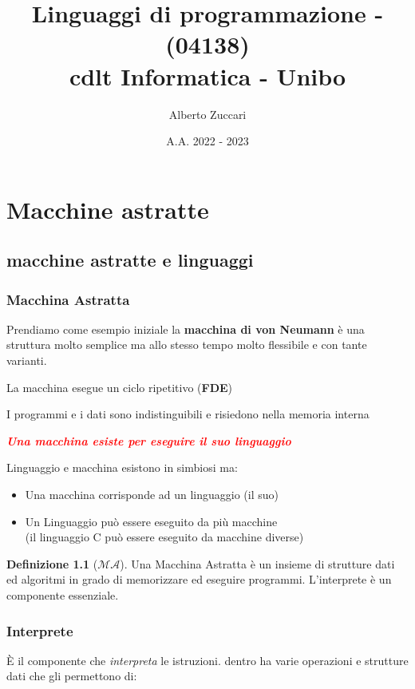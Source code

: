 \documentclass[a4paper,11pt,hidelinks]{book}
\title{Linguaggi di programmazione - (04138)
    \\ cdlt Informatica - Unibo}
\author{Alberto Zuccari}
\date{A.A. 2022 - 2023}
\theoremstyle{definition}
\newtheorem*{definizione}{Definizione}
\begin{document}
\maketitle

\tableofcontents

\chapter{Macchine astratte}

\section{macchine astratte e linguaggi}

    \subsection{Macchina Astratta}

    Prendiamo come esempio iniziale la \textbf{macchina di von Neumann} è una struttura molto semplice ma allo stesso tempo molto flessibile e con tante varianti.
    
    La macchina esegue un ciclo ripetitivo (\textbf{FDE})
    
    I programmi e i dati sono indistinguibili e risiedono nella memoria interna
    \begin{center}
    \textcolor{red}{\textit{\textbf{Una macchina esiste per eseguire il suo linguaggio}}}
    \end{center}
    Linguaggio e macchina esistono in simbiosi ma:
    \begin{itemize}
        \item Una macchina corrisponde ad un linguaggio (il suo)
        \item Un Linguaggio può essere eseguito da più macchine \\
            (il linguaggio C può essere eseguito da macchine diverse)
    \end{itemize}
    
    \begin{definizione}[$\mathcal{MA}$]\label{MA}
    Una Macchina Astratta è un insieme di strutture dati ed algoritmi in grado di memorizzare ed eseguire programmi. L'interprete è un componente essenziale.
    \end{definizione}
    
    \subsection{Interprete}
    È il componente che \textit{interpreta} le istruzioni.
    dentro ha varie operazioni e strutture dati che gli permettono di:
    
\end{document}

